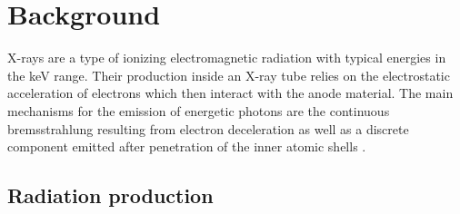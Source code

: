 \section{Background}

X-rays are a type of ionizing electromagnetic radiation with typical energies in the \unit{\kilo\electronvolt} range. Their
production inside an X-ray tube relies on the electrostatic acceleration of electrons which then interact with the anode material. The main
mechanisms for the emission of energetic photons are the continuous bremsstrahlung resulting from electron deceleration as well as a
discrete component emitted after penetration of the inner atomic shells \cite{McMorrow_2011_1, McMorrow_2011_2}.



\subsection{Radiation production}

